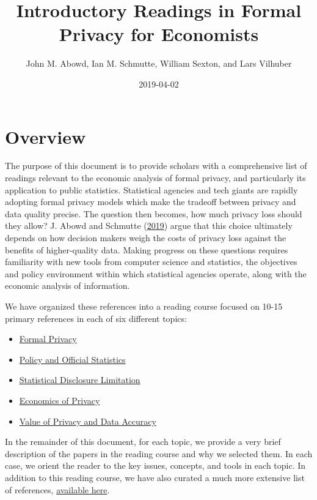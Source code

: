\documentclass[]{article}
\title{Introductory Readings in Formal Privacy for Economists}
\author{John M. Abowd, Ian M. Schmutte, William Sexton, and Lars Vilhuber}
\date{2019-04-02}
\providecommand{\tightlist}{%
  \setlength{\itemsep}{0pt}\setlength{\parskip}{0pt}}
\begin{document}
\maketitle

{
\setcounter{tocdepth}{1}
\tableofcontents
}
\section{Overview}\label{overview}

The purpose of this document is to provide scholars with a comprehensive
list of readings relevant to the economic analysis of formal privacy,
and particularly its application to public statistics. Statistical
agencies and tech giants are rapidly adopting formal privacy models
which make the tradeoff between privacy and data quality precise. The
question then becomes, how much privacy loss should they allow? J. Abowd
and Schmutte (\protect\hyperlink{ref-AbowdSchmutte:Privacy:AER}{2019})
argue that this choice ultimately depends on how decision makers weigh
the costs of privacy loss against the benefits of higher-quality data.
Making progress on these questions requires familiarity with new tools
from computer science and statistics, the objectives and policy
environment within which statistical agencies operate, along with the
economic analysis of information.

We have organized these references into a reading course focused on
10-15 primary references in each of six different topics:

\begin{itemize}
\tightlist
\item
  \protect\hyperlink{formal-privacy}{Formal Privacy}
\item
  \protect\hyperlink{policy-and-official-statistics}{Policy and Official
  Statistics}
\item
  \protect\hyperlink{statistical-disclosure-limitation}{Statistical
  Disclosure Limitation}
\item
  \protect\hyperlink{economics-of-privacy}{Economics of Privacy}
\item
  \protect\hyperlink{value-of-privacy-and-data-accuracy}{Value of
  Privacy and Data Accuracy}
\end{itemize}

In the remainder of this document, for each topic, we provide a very
brief description of the papers in the reading course and why we
selected them. In each case, we orient the reader to the key issues,
concepts, and tools in each topic. In addition to this reading course,
we have also curated a much more extensive list of references,
\href{sloan-privacy-bibliography.pdf}{available here}.
\end{document}
